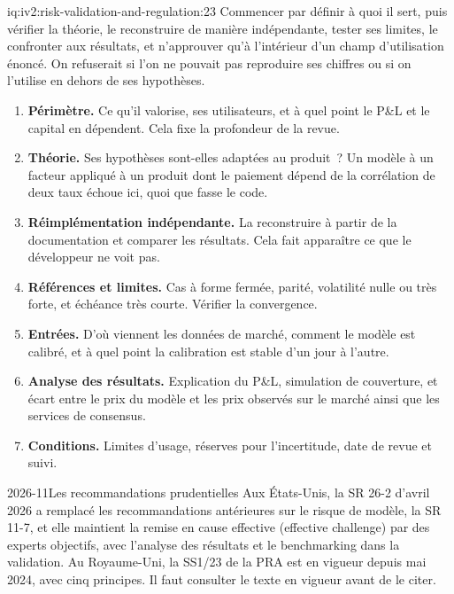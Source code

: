 \begin{solution}{iq:iv2:risk-validation-and-regulation:23}
Commencer par définir à quoi il sert, puis vérifier la théorie, le reconstruire de manière indépendante, tester ses limites, le confronter aux résultats, et n'approuver qu'à l'intérieur d'un champ d'utilisation énoncé. On refuserait si l'on ne pouvait pas reproduire ses chiffres ou si on l'utilise en dehors de ses hypothèses.

\begin{enumerate}
\item \textbf{Périmètre.} Ce qu'il valorise, ses utilisateurs, et à quel point le P\&L et le capital en dépendent. Cela fixe la profondeur de la revue.
\item \textbf{Théorie.} Ses hypothèses sont-elles adaptées au produit~? Un modèle à un facteur appliqué à un produit dont le paiement dépend de la corrélation de deux taux échoue ici, quoi que fasse le code.
\item \textbf{Réimplémentation indépendante.} La reconstruire à partir de la documentation et comparer les résultats. Cela fait apparaître ce que le développeur ne voit pas.
\item \textbf{Références et limites.} Cas à forme fermée, parité, volatilité nulle ou très forte, et échéance très courte. Vérifier la convergence.
\item \textbf{Entrées.} D'où viennent les données de marché, comment le modèle est calibré, et à quel point la calibration est stable d'un jour à l'autre.
\item \textbf{Analyse des résultats.} Explication du P\&L, simulation de couverture, et écart entre le prix du modèle et les prix observés sur le marché ainsi que les services de consensus.
\item \textbf{Conditions.} Limites d'usage, réserves pour l'incertitude, date de revue et suivi.
\end{enumerate}

\begin{dated}{2026-11}{Les recommandations prudentielles}\label{dat:iv2:risk-validation-and-regulation:mrm}
Aux États-Unis, la SR 26-2 d'avril 2026 a remplacé les recommandations antérieures sur le risque de modèle, la SR 11-7, et elle maintient la remise en cause effective (effective challenge) par des experts objectifs, avec l'analyse des résultats et le benchmarking dans la validation. Au Royaume-Uni, la SS1/23 de la PRA est en vigueur depuis mai 2024, avec cinq principes. Il faut consulter le texte en vigueur avant de le citer.
\end{dated}

\end{solution}

